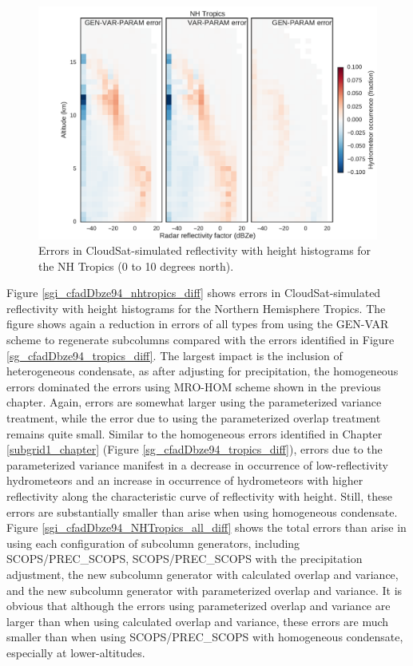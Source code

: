 \begin{figure}
\centering
\includegraphics[width=\columnwidth]{graphics/subgrid2_cfadDbze94_NHTropics_gen-var-param_diff.pdf}
\caption{Errors in CloudSat-simulated reflectivity with height histograms for the NH Tropics (0 to 10 degrees north).}
\label{sgi_cfadDbze94_nhtropics_gen-var-param_diff}
\end{figure}

Figure \ref{sgi_cfadDbze94_nhtropics_diff} shows errors in CloudSat-simulated reflectivity with height histograms for the Northern Hemisphere Tropics. The figure shows again a reduction in errors of all types from using the GEN-VAR scheme to regenerate subcolumns compared with the errors identified in Figure \ref{sg_cfadDbze94_tropics_diff}. The largest impact is the inclusion of heterogeneous condensate, as after adjusting for precipitation, the homogeneous errors dominated the errors using MRO-HOM scheme shown in the previous chapter. Again, errors are somewhat larger using the parameterized variance treatment, while the error due to using the parameterized overlap treatment remains quite small. Similar to the homogeneous errors identified in Chapter \ref{subgrid1_chapter} (Figure \ref{sg_cfadDbze94_tropics_diff}), errors due to the parameterized variance manifest in a decrease in occurrence of low-reflectivity hydrometeors and an increase in occurrence of hydrometeors with higher reflectivity along the characteristic curve of reflectivity with height. Still, these errors are substantially smaller than arise when using homogeneous condensate. Figure \ref{sgi_cfadDbze94_NHTropics_all_diff} shows the total errors than arise in using each configuration of subcolumn generators, including SCOPS/PREC\_SCOPS, SCOPS/PREC\_SCOPS with the precipitation adjustment, the new subcolumn generator with calculated overlap and variance, and the new subcolumn generator with parameterized overlap and variance. It is obvious that although the errors using parameterized overlap and variance are larger than when using calculated overlap and variance, these errors are much smaller than when using SCOPS/PREC\_SCOPS with homogeneous condensate, especially at lower-altitudes.

